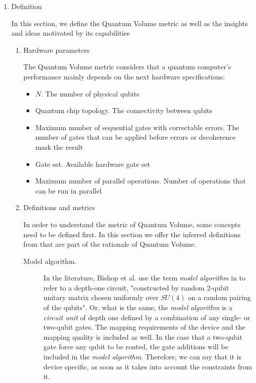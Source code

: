 \begin{enumerate}
\item Definition
\label{sec:org45b63d8}

In this section, we define the Quantum Volume metric as well as the insights and ideas motivated by its capabilities

\begin{enumerate}
\item Hardware parameters
\label{sec:org0c1c158}

The Quantum Volume metric considers that a quantum computer's performance mainly depends on the next hardware specifications:

\begin{itemize}
\item \(N\). The number of physical qubits
\item Quantum chip topology. The connectivity between qubits
\item Maximum number of sequential gates with correctable errors. The number of gates that can be applied before errors or decoherence mask the result
\item Gate set. Available hardware gate set
\item Maximum number of parallel operations. Number of operations that can be run in parallel
\end{itemize}

\item Definitions and metrics
\label{sec:orgc5905c5}

In order to understand the metric of Quantum Volume, some concepts need to be defined first. 
In this section we offer the inferred definitions from \cite{Bishop_2017,Moll_2018} that are part of the rationale of Quantum Volume.


\begin{description}
\item[{Model algorithm.}] In the literature, Bishop et al. use the term \emph{model algorithm} in \cite{Bishop_2017} to refer to a depth-one circuit, "constructed by random 2-qubit unitary matrix chosen uniformly over \(SU (4)\) on a random pairing of the qubits". Or, what is the same, the \emph{model algorithm} is a \emph{circuit unit} of depth one defined by a combination of any single- or two-qubit gates. The mapping requirements of the device and the mapping quality is included as well. In the case that a two-qubit gate force any qubit to be routed, the gate additions will be included in the \emph{model algorithm}. Therefore, we can say that it is device specific, as soon as it takes into account the constraints from it.
\end{description}


\end{enumerate}
\end{enumerate}
